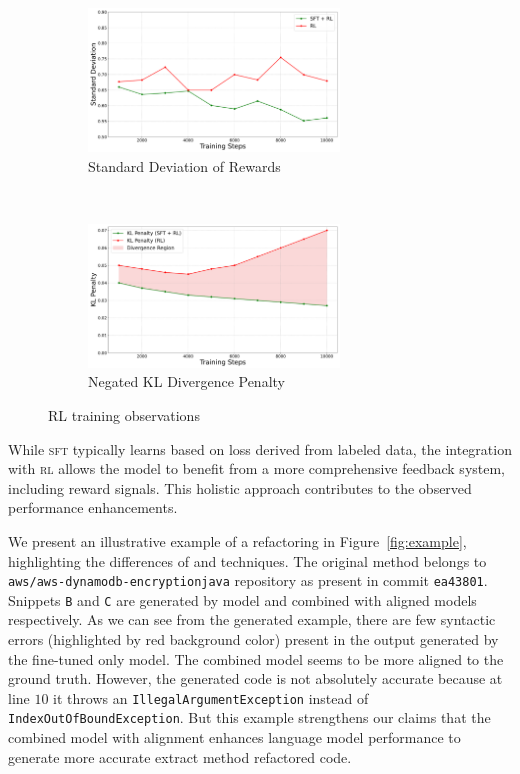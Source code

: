 \begin{figure}[ht!]
    \centering
    \begin{subfigure}[t]{0.45\textwidth}
        \centering
        \includegraphics[height=1.5in]{chapters/generation/images/std_reward.pdf}
       \caption{Standard Deviation of Rewards}
        \label{fig:std_reward}
    \end{subfigure}
 ~
    \begin{subfigure}[t]{0.45\textwidth}
        \centering
        \includegraphics[height=1.5in]{chapters/generation/images/kl_penalty.pdf}
        \caption{Negated KL Divergence Penalty}
        \label{fig:kl_penalty}
    \end{subfigure}
    \caption{RL training observations}
    \label{fig:rl_stats}
\end{figure}


While \textsc{sft} typically learns based on loss derived from labeled data, the integration with \textsc{rl} allows the model to benefit from a more comprehensive feedback system, including reward signals. This holistic approach contributes to the observed performance enhancements.

We present an illustrative example of a \exm{} refactoring in Figure~\ref{fig:example}, highlighting the differences of \sft{} and \rl{} techniques.
The original method belongs to \texttt{aws/aws-dynamodb-encryption\-java} repository as present in commit \texttt{ea43801}. 
Snippets \texttt{B} and \texttt{C} are generated by \sft{} model and combined \sft{} with \rl{} aligned models respectively. As we can see from the generated example, there are few syntactic errors (highlighted by red background color) present in the output generated by the fine-tuned only model. The combined \rl{} model seems to be more aligned to the ground truth. However, the generated code is not absolutely accurate because at line $10$ it throws an \texttt{IllegalArgumentException} instead of \texttt{IndexOutOfBoundException}. But this example strengthens our claims that the combined \sft{} model with \rl{} alignment enhances language model performance to generate more accurate extract method refactored code.

